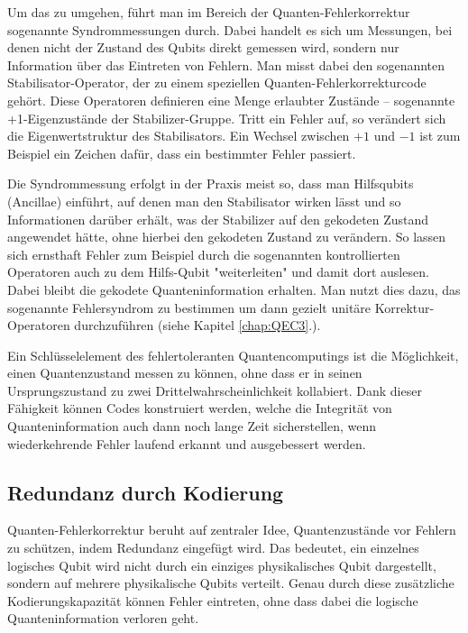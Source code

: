 Um das zu umgehen, führt man im Bereich der Quanten-Fehlerkorrektur sogenannte Syndrommessungen durch. Dabei handelt es sich um Messungen, bei denen nicht der Zustand des Qubits direkt gemessen wird, sondern nur Information über das Eintreten von Fehlern. Man misst dabei den sogenannten Stabilisator-Operator, der zu einem speziellen Quanten-Fehlerkorrekturcode gehört. Diese Operatoren definieren eine Menge erlaubter Zustände – sogenannte +1-Eigenzustände der Stabilizer-Gruppe. Tritt ein Fehler auf, so verändert sich die Eigenwertstruktur des Stabilisators. Ein Wechsel zwischen \(+1\) und \(-1\) ist zum Beispiel ein  Zeichen dafür, dass ein bestimmter Fehler passiert. \cite[Seite 444-446]{nielsen_michael_a_and_isaac_l_chuang_quantum_2010}

Die Syndrommessung erfolgt in der Praxis meist so, dass man Hilfsqubits (Ancillae) einführt, auf denen man den Stabilisator wirken lässt und so Informationen darüber erhält, was der Stabilizer auf den gekodeten Zustand angewendet hätte, ohne hierbei den gekodeten Zustand zu verändern. So lassen sich ernsthaft Fehler zum Beispiel durch die sogenannten kontrollierten Operatoren auch zu dem Hilfs-Qubit "weiterleiten" und damit dort auslesen. Dabei bleibt die gekodete Quanteninformation erhalten. Man nutzt dies dazu, das sogenannte Fehlersyndrom zu bestimmen um dann gezielt unitäre Korrektur-Operatoren durchzuführen (siehe Kapitel \ref{chap:QEC3}.). \cite[Seite 444-446]{nielsen_michael_a_and_isaac_l_chuang_quantum_2010}

Ein Schlüsselelement des fehlertoleranten Quantencomputings ist die Möglichkeit, einen Quantenzustand messen zu können, ohne dass er in seinen Ursprungszustand zu zwei Drittelwahrscheinlichkeit kollabiert. Dank dieser Fähigkeit können Codes konstruiert werden, welche die Integrität von Quanteninformation auch dann noch lange Zeit sicherstellen, wenn wiederkehrende Fehler laufend erkannt und ausgebessert werden.

\subsection{Redundanz durch Kodierung}
Quanten-Fehlerkorrektur beruht auf zentraler Idee, Quantenzustände vor Fehlern zu schützen, indem Redundanz eingefügt wird. Das bedeutet, ein einzelnes logisches Qubit wird nicht durch ein einziges physikalisches Qubit dargestellt, sondern auf mehrere physikalische Qubits verteilt. Genau durch diese zusätzliche Kodierungskapazität können Fehler eintreten, ohne dass dabei die logische Quanteninformation verloren geht.

